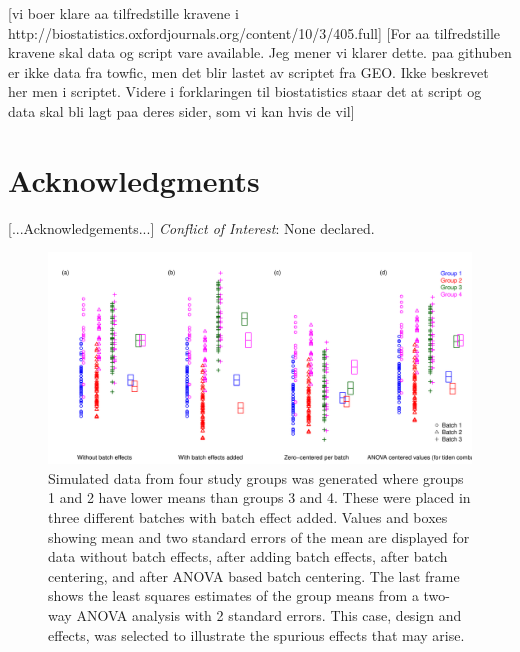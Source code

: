 \documentclass{bio}
\newcommand\NOTE[1]{{\color{red}[#1]}}
\begin{document}
\NOTE{vi boer klare aa tilfredstille kravene i http://biostatistics.oxfordjournals.org/content/10/3/405.full}
\NOTE{For aa tilfredstille kravene skal data og script vare available. Jeg mener vi klarer dette. paa githuben er ikke data fra towfic, men det blir lastet av scriptet fra GEO. Ikke beskrevet her men i scriptet. Videre i forklaringen til biostatistics staar det at script og data skal bli lagt paa deres sider, som vi kan hvis de vil}

\section*{Acknowledgments}

[...Acknowledgements...]
{\it Conflict of Interest}: None declared.




%



\begin{figure}[!p]
\centering\includegraphics[width=13cm]{../figure1.pdf}
\caption{Simulated data from four study groups was generated where groups 1 and 2 have lower means than groups 3 and 4. These were placed in three different batches with batch effect added. Values and boxes showing mean and two standard errors of the mean are displayed for data without batch effects, after adding batch effects, after batch centering, and after ANOVA based batch centering. The last frame shows the least squares estimates of the group means from a two-way ANOVA analysis with 2 standard errors. This case, design and effects, was selected to illustrate the spurious effects that may arise.}
\label{fig:boxplots}
\end{figure}
\end{document}
